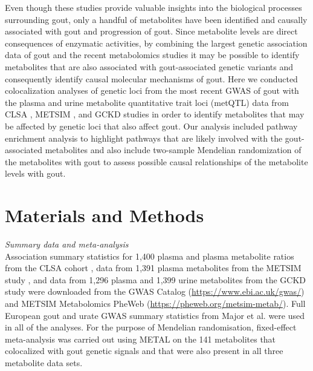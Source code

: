 \documentclass[gucdd,article,submit,pdftex,moreauthors]{Definitions/mdpi}
\begin{document}
Even though these studies provide valuable insights into the biological processes surrounding gout, only a handful of metabolites have been identified and causally associated with gout and progression of gout.
Since metabolite levels are direct consequences of enzymatic activities, by combining the largest genetic association data of gout \citep{major_genome-wide_2024} and the recent metabolomics studies \citep{chen_genomic_2023,yin_genome-wide_2022,schlosser_genetic_2023} it may be possible to identify metabolites that are also associated with gout-associated genetic variants and consequently identify causal molecular mechanisms of gout.
Here we conducted colocalization analyses of genetic loci from the most recent GWAS of gout \citep{major_genome-wide_2024} with the plasma and urine metabolite quantitative trait loci (metQTL) data from CLSA \citep{chen_genomic_2023}, METSIM \citep{yin_genome-wide_2022}, and GCKD \citep{schlosser_genetic_2023} studies in order to identify meta\-bolites that may be affected by genetic loci that also affect gout.
Our analysis included pathway enrichment analysis to highlight pathways that are likely involved with the gout-associated metabolites and also include two-sample Mendelian randomization of the metabolites with gout to assess possible causal relationships of the metabolite levels with gout.

\section{Materials and Methods}

\noindent
\textit{Summary data and meta-analysis}\\
Association summary statistics for 1,400 plasma and plasma metabolite ratios from the CLSA cohort \citep{chen_genomic_2023}, data from 1,391 plasma metabolites from the METSIM study \citep{yin_genome-wide_2022}, and data from 1,296 plasma and 1,399 urine metabolites from the GCKD study \citep{schlosser_genetic_2023} were downloaded from the GWAS Catalog (\url{https://www.ebi.ac.uk/gwas/}) and METSIM Metabolomics PheWeb (\url{https://pheweb.org/metsim-metab/}).
Full European gout and urate GWAS summary statistics from Major et al. \citep{major_genome-wide_2024} were used in all of the analyses.
For the purpose of Mendelian randomisation, fixed-effect meta-analysis was carried out using METAL \citep{willer_metal_2010} on the 141 metabolites that colocalized with gout genetic signals and that were also present in all three metabolite data sets.
\\
\end{document}
